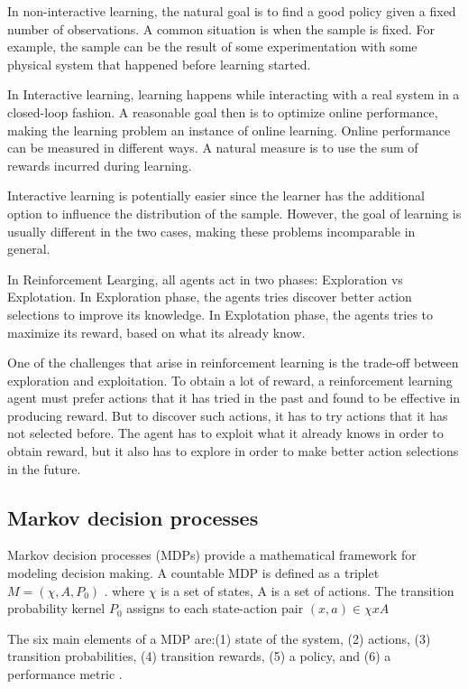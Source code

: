 In non-interactive learning, the natural goal is to find a good policy given a fixed number of observations. A common situation is when the sample is fixed. For example, the sample can be the result of some experimentation with some physical system that happened before learning started. 

In Interactive learning, learning happens while interacting with a real system in a closed-loop fashion. A reasonable goal then is to optimize online performance,
making the learning problem an instance of online learning. Online performance can be measured in different ways. A natural measure is to use the sum of rewards incurred during learning. 

Interactive learning is potentially easier since the learner has the additional option to influence the distribution of the sample. However, the goal of
learning is usually different in the two cases, making these problems incomparable in general.

In Reinforcement Learging, all agents act in two phases: Exploration vs Explotation. In Exploration phase, the agents tries discover better action selections to improve its knowledge. In Explotation phase, the agents tries to maximize its reward, based on what its already know.

One of the challenges that arise in reinforcement learning is the trade-off between exploration and exploitation. To obtain a lot of reward, a reinforcement learning
agent must prefer actions that it has tried in the past and found to be effective in producing reward.
But to discover such actions, it has to try actions that it has not selected before. The agent has to exploit what it already knows in order to obtain reward, but it also has to explore in order to make better action selections in the future.





\subsection{Markov decision processes}

Markov decision processes (MDPs) provide a mathematical framework for modeling decision making. A countable MDP is defined as a triplet $M=(\chi,A,P_{0})$ \cite{Szepesvari2010}. where $\chi$ is a set of states, A is a set of actions. The transition probability kernel $P_{0}$ assigns to each state-action pair $(x, a) \in \chi x A $


The six main elements of a MDP are:(1) state of the system, (2) actions, (3) transition probabilities, (4) transition rewards, (5) a policy, and (6) a performance metric \cite{Sutton2012}.

